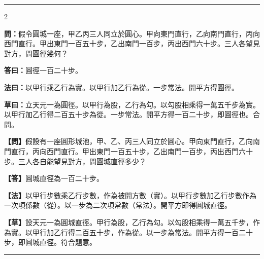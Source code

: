 \documentclass[11pt,a4paper]{article}
\newcommand{\longline}{\noindent\rule{\textwidth}{0.4pt}}
\newcommand{\wenC}[1]{\par\noindent\textbf{\textcolor{probcolor}{問：}}{#1}\par}
\newcommand{\daC}[1]{\par\noindent\textbf{\textcolor{anscolor}{答曰：}}{#1}\par}
\newcommand{\fayueC}[1]{\par\noindent\textbf{\textcolor{methodcolor}{法曰：}}{#1}\par}
\newcommand{\caoyueC}[1]{\par\noindent\textbf{草曰：}{#1}\par}
\newcommand{\wenM}[1]{\par\noindent\textbf{\textcolor{probcolor}{【問】}}{#1}\par}
\newcommand{\daM}[1]{\par\noindent\textbf{\textcolor{anscolor}{【答】}}{#1}\par}
\newcommand{\fayueM}[1]{\par\noindent\textbf{\textcolor{methodcolor}{【法】}}{#1}\par}
\newcommand{\caoyueM}[1]{\par\noindent\textbf{【草】}{#1}\par}
\begin{document}
\vspace{0.3cm}
\longline

\begin{paracol}{2}

\wenC{假令圓城一座，甲乙丙三人同立於圓心。甲向東門直行，乙向南門直行，丙向西門直行。甲出東門一百五十步，乙出南門一百步，丙出西門六十步。三人各望見對方，問圓徑幾何？}

\daC{圓徑一百二十步。}

\fayueC{以甲行乘乙行為實。以甲行加乙行為從。一步常法。開平方得圓徑。}

\caoyueC{立天元一為圓徑。以甲行為股，乙行為勾。以勾股相乘得一萬五千步為實。以甲行加乙行得二百五十步為從。一步常法。開平方得一百二十步，即圓徑也。合問。}

\switchcolumn

\wenM{假設有一座圓形城池，甲、乙、丙三人同立於圓心。甲向東門直行，乙向南門直行，丙向西門直行。甲出東門一百五十步，乙出南門一百步，丙出西門六十步。三人各自能望見對方，問圓城直徑多少？}

\daM{圓城直徑為一百二十步。}

\fayueM{以甲行步數乘乙行步數，作為被開方數（實）。以甲行步數加乙行步數作為一次項係數（從）。以一步為二次項常數（常法）。開平方即得圓城直徑。}

\caoyueM{設天元一為圓城直徑。甲行為股，乙行為勾。以勾股相乘得一萬五千步，作為實。以甲行加乙行得二百五十步，作為從。以一步為常法。開平方得一百二十步，即圓城直徑。符合題意。}

\end{paracol}

\vspace{0.3cm}
\longline
\end{document}
